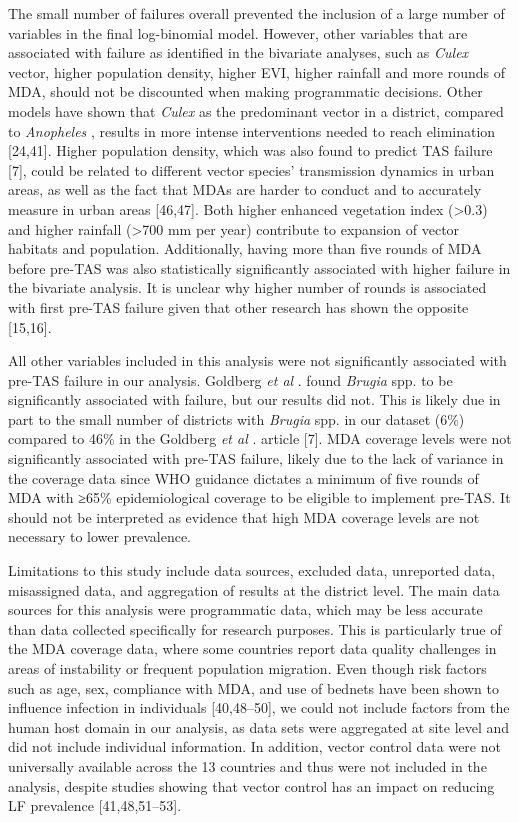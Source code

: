 \documentclass[11pt,a4paper]{article}
\begin{document}
The small number of failures overall prevented the inclusion of a large number of variables in the final log-binomial model. However, other variables that are associated with failure as identified in the bivariate analyses, such as \textit{Culex} vector, higher population density, higher EVI, higher rainfall and more rounds of MDA, should not be discounted when making programmatic decisions. Other models have shown that \textit{Culex} as the predominant vector in a district, compared to \textit{Anopheles} , results in more intense interventions needed to reach elimination [24,41]. Higher population density, which was also found to predict TAS failure [7], could be related to different vector species’ transmission dynamics in urban areas, as well as the fact that MDAs are harder to conduct and to accurately measure in urban areas [46,47]. Both higher enhanced vegetation index (>0.3) and higher rainfall (>700 mm per year) contribute to expansion of vector habitats and population. Additionally, having more than five rounds of MDA before pre-TAS was also statistically significantly associated with higher failure in the bivariate analysis. It is unclear why higher number of rounds is associated with first pre-TAS failure given that other research has shown the opposite [15,16].

All other variables included in this analysis were not significantly associated with pre-TAS failure in our analysis. Goldberg \textit{et al} . found \textit{Brugia} spp. to be significantly associated with failure, but our results did not. This is likely due in part to the small number of districts with \textit{Brugia} spp. in our dataset (6\%) compared to 46\% in the Goldberg \textit{et al} . article [7]. MDA coverage levels were not significantly associated with pre-TAS failure, likely due to the lack of variance in the coverage data since WHO guidance dictates a minimum of five rounds of MDA with ≥65\% epidemiological coverage to be eligible to implement pre-TAS. It should not be interpreted as evidence that high MDA coverage levels are not necessary to lower prevalence.

Limitations to this study include data sources, excluded data, unreported data, misassigned data, and aggregation of results at the district level. The main data sources for this analysis were programmatic data, which may be less accurate than data collected specifically for research purposes. This is particularly true of the MDA coverage data, where some countries report data quality challenges in areas of instability or frequent population migration. Even though risk factors such as age, sex, compliance with MDA, and use of bednets have been shown to influence infection in individuals [40,48–50], we could not include factors from the human host domain in our analysis, as data sets were aggregated at site level and did not include individual information. In addition, vector control data were not universally available across the 13 countries and thus were not included in the analysis, despite studies showing that vector control has an impact on reducing LF prevalence [41,48,51–53].
\end{document}
